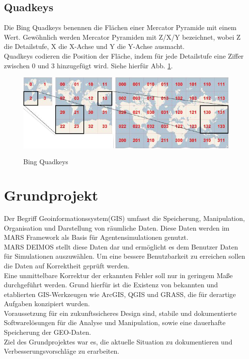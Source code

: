 \documentclass[10pt,conference,compsocconf]{IEEEtran}
\begin{document}
\subsection{Quadkeys}
\label{Quadyeys}
Die Bing Quadkeys benennen die Flächen einer Mercator Pyramide mit einem Wert. Gewöhnlich werden Mercator Pyramiden mit Z/X/Y bezeichnet, wobei Z die Detailstufe, X die X-Achse und Y die Y-Achse ausmacht.\\
Quadkeys codieren die Position der Fläche, indem für jede Detailstufe eine Ziffer zwischen 0 und 3 hinzugefügt wird. Siehe hierfür Abb. \ref{img:bing_quads}.
\begin{figure}[H]
	\centering
	\includegraphics[width=1\columnwidth]{img/bing_quads.png}\\
	\caption[]{Bing Quadkeys\cite{BingQuadkeys}}
	\label{img:bing_quads}
\end{figure}



\section{Grundprojekt}
Der Begriff Geoinformationssystem(GIS) umfasst die Speicherung, Manipulation, Organisation und Darstellung von räumliche Daten. Diese Daten werden im MARS Framework als Basis für Agentensimulationen genutzt.\\
MARS DEIMOS stellt diese Daten dar und ermöglicht es dem Benutzer Daten für Simulationen auszuwählen. Um eine bessere Benutzbarkeit zu erreichen sollen die Daten auf Korrektheit geprüft werden.\\
Eine unmittelbare Korrektur der erkannten Fehler soll nur in geringem Maße durchgeführt werden. Grund hierfür ist die Existenz von bekannten und etablierten GIS-Werkzeugen wie ArcGIS, QGIS und GRASS, die für derartige Aufgaben konzipiert wurden.\\
Voraussetzung für ein zukunftssicheres Design sind, stabile und dokumentierte Softwarelösungen für die Analyse und Manipulation, sowie eine dauerhafte Speicherung der GEO-Daten.\\
Ziel des Grundprojektes war es, die aktuelle Situation zu dokumentieren und Verbesserungsvorschläge zu erarbeiten.
\end{document}
